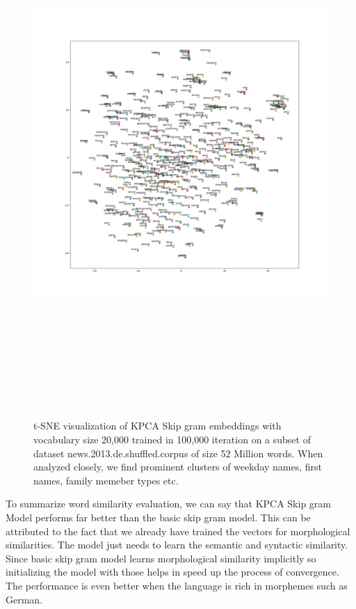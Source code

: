 \begin{figure}[H]
	\hskip-2cm
	\includegraphics[width=20cm,height=20cm,keepaspectratio]{files/deWiki20kVocab/MYtsne.png}
	\caption{t-SNE visualization of KPCA Skip gram embeddings with vocabulary size 20,000 trained in 100,000 iteration on a subset of dataset news.2013.de.shuffled.corpus of size 52 Million words. When analyzed closely, we find prominent clusters of weekday names, first names, family memeber types etc.}
	\label{fig:tsnee5}
\end{figure}
 
To summarize word similarity evaluation, we can say that KPCA Skip gram Model performs far better than the basic skip gram model. This can be attributed to the fact that we already have trained the vectors for morphological similarities. The model just needs to learn the semantic and syntactic similarity. Since basic skip gram model learns morphological similarity implicitly so initializing the model with those helps in speed up the process of convergence. The performance is even better when the language is rich in morphemes such as German.
